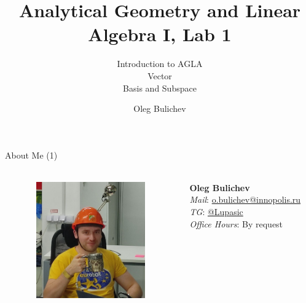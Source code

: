 \documentclass[aspectratio=169,notes]{beamer}
\title[AGLA1]{Analytical Geometry and Linear Algebra I, Lab 1} %
\subtitle{Introduction to AGLA \\ Vector  \\ Basis and Subspace  
         } %
\author{Oleg Bulichev}
\newcommand{\fbckg}[1]{\usebackgroundtemplate{\texttt{[image: \#1]}}}%
\begin{document}
\setlength{\abovedisplayskip}{0pt}
\setlength{\belowdisplayskip}{0pt}
\setlength{\abovedisplayshortskip}{0pt}
\setlength{\belowdisplayshortskip}{0pt}

\fbckg{fibeamer/figs/title_page.png}

\fbckg{fibeamer/figs/common.png}

\begin{frame}[t]{About Me (1)}
    \framesubtitle{}
    \begin{columns}[T,onlytextwidth]
        \begin{column}{0.49\textwidth}
            \begin{figure}[H]
                \centering\includegraphics[height=5cm,width=1\textwidth,keepaspectratio]{Oleg.jpg}
                \label{fig:Oleg.jpg}
            \end{figure}
        \end{column}
        \begin{column}{0.49\textwidth}
            \Large
            \vspace{2cm}
            \centering
            \textbf{Oleg Bulichev} \\
            \textit{Mail}: \url{o.bulichev@innopolis.ru}\\
            \textit{TG}: \url{@Lupasic} \\
            \textit{Office Hours}: By request
        \end{column}
    \end{columns}
\end{frame}
\end{document}
